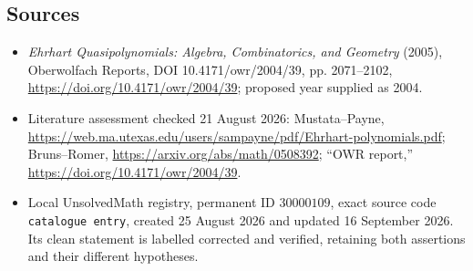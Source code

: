\documentclass[11pt]{article}
\begin{document}
\subsection{Sources}
\begin{itemize}
\item \emph{Ehrhart Quasipolynomials: Algebra, Combinatorics, and Geometry} (2005), Oberwolfach Reports, DOI 10.4171/owr/2004/39, pp. 2071--2102, \url{https://doi.org/10.4171/owr/2004/39}; proposed year supplied as 2004.
\item Literature assessment checked 21 August 2026: Mustata--Payne, \url{https://web.ma.utexas.edu/users/sampayne/pdf/Ehrhart-polynomials.pdf}; Bruns--Romer, \url{https://arxiv.org/abs/math/0508392}; ``OWR report,'' \url{https://doi.org/10.4171/owr/2004/39}.
\item Local UnsolvedMath registry, permanent ID $30000109$, exact source code \texttt{catalogue entry}, created 25 August 2026 and updated 16 September 2026. Its clean statement is labelled corrected and verified, retaining both assertions and their different hypotheses.
\end{itemize}
\end{document}
